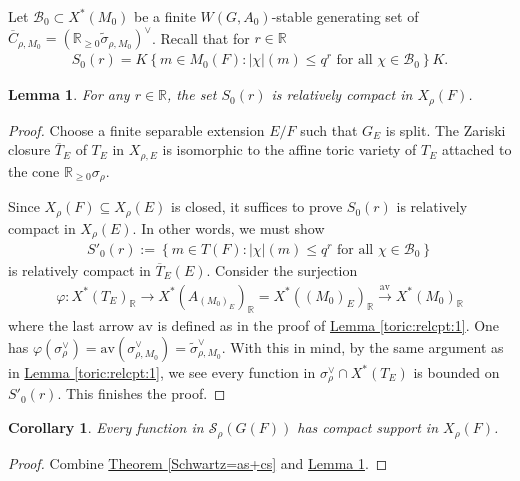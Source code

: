 \documentclass[10pt]{amsart}
\newtheorem{corollary}{Corollary}[theorem]
\newtheorem{lemma}[theorem]{Lemma}
\theoremstyle{definition}
\numberwithin{equation}{section}
\numberwithin{equation}{subsection}
\newcommand{\RR}{\mathbb{R}}
\newcommand{\calB}{\mathcal{B}}
\begin{document}
Let $\calB_0\subset X^\ast(M_0)$ be a finite $W(G,A_0)$-stable generating set of  $\overline{C}_{\rho,M_0}= (\mathbb{R}_{\geq0}\widetilde{\sigma}_{\rho,M_0})^\vee$. Recall that for $r\in \RR$
\begin{align*}
     S_0(r)=K\left\{ m\in M_0(F): |\chi|(m)\le q^r \textrm{ for all } \chi\in \calB_0\right\}K.
\end{align*}
\begin{lemma}\label{lem:bounded}
    For any $r\in\RR$, the set $S_0(r)$ is relatively compact in $X_\rho(F)$. 
\end{lemma}
\begin{proof}
Choose a finite separable extension $E/F$ such that $G_E$ is split. The Zariski closure $\overline{T}_E$ of $T_E$ in $X_{\rho,E}$ is isomorphic to the affine toric variety of $T_E$ attached to the cone $\RR_{\geq 0}\sigma_{\rho}$.


Since $X_{\rho}(F)\subseteq X_{\rho}(E)$ is closed, it suffices to prove $S_0(r)$ is relatively compact in $X_{\rho}(E)$. In other words, we must show
\begin{align*}
    S'_0(r):=\left\{ m\in T(F): |\chi|(m)\le q^r \textrm{ for all } \chi\in \calB_0\right\}
\end{align*}
is relatively compact in $\overline{T}_E(E)$. Consider the surjection
\begin{align*}
    \varphi:X^*(T_E)_\RR \longrightarrow X^*(A_{(M_0)_E})_\RR = X^*((M_{0})_E)_\RR \stackrel{\mathrm{av}}{\longrightarrow}X^*(M_0)_\RR
\end{align*}
where the last arrow $\mathrm{av}$ is defined as in the proof of \hyperref[toric:relcpt:1]{Lemma \ref{toric:relcpt:1}}. One has $\varphi(\sigma_\rho^\vee) = \mathrm{av}(\sigma_{\rho,M_0}^\vee) = \widetilde{\sigma}_{\rho,M_0}^\vee$. With this in mind, by the same argument as in \hyperref[toric:relcpt:1]{Lemma \ref{toric:relcpt:1}}, we see every function in $\sigma_{\rho}^\vee\cap X^*(T_E)$ is bounded on $S'_0(r)$.  This finishes the proof.
\end{proof}

\begin{corollary}\label{cor:compactsupport} Every function in $\mathcal{S}_\rho(G(F))$ has compact support in $X_\rho(F)$.
\end{corollary}
\begin{proof} Combine \hyperref[Schwartz=as+cs]{Theorem \ref{Schwartz=as+cs}} and \hyperref[lem:bounded]{Lemma \ref{lem:bounded}}.
\end{proof}
\end{document}
